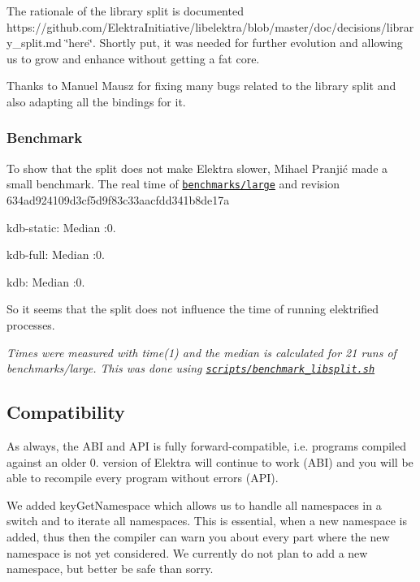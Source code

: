 The rationale of the library split is documented https\+://github.com/\+Elektra\+Initiative/libelektra/blob/master/doc/decisions/library\+\_\+split.\+md \char`\"{}here\char`\"{}. Shortly put, it was needed for further evolution and allowing us to grow and enhance without getting a fat core.

Thanks to Manuel Mausz for fixing many bugs related to the library split and also adapting all the bindings for it.

\subsubsection*{Benchmark}

To show that the split does not make Elektra slower, Mihael Pranjić made a small benchmark. The real time of \href{https://github.com/ElektraInitiative/libelektra/blob/master/benchmarks/large.c}{\tt benchmarks/large} and revision 634ad924109d3cf5d9f83c33aacfdd341b8de17a


\begin{DoxyEnumerate}
\item kdb-\/static\+: Median \+:0.
\item kdb-\/full\+: Median \+:0.
\item kdb\+: Median \+:0.
\end{DoxyEnumerate}

So it seems that the split does not influence the time of running elektrified processes.

{\itshape Times were measured with time(1) and the median is calculated for 21 runs of benchmarks/large. This was done using \href{https://github.com/ElektraInitiative/libelektra/blob/master/scripts/benchmark_libsplit.sh}{\tt scripts/benchmark\+\_\+libsplit.\+sh}}

\subsection*{Compatibility}

As always, the A\+BI and A\+PI is fully forward-\/compatible, i.\+e. programs compiled against an older 0. version of Elektra will continue to work (A\+BI) and you will be able to recompile every program without errors (A\+PI).

We added {\ttfamily key\+Get\+Namespace} which allows us to handle all namespaces in a switch and to iterate all namespaces. This is essential, when a new namespace is added, thus then the compiler can warn you about every part where the new namespace is not yet considered. We currently do not plan to add a new namespace, but better be safe than sorry.

